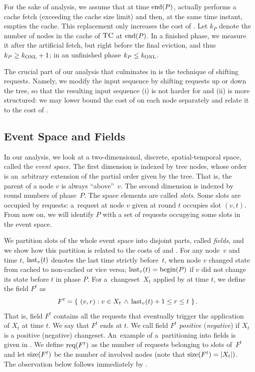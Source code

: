 For the sake of analysis, we assume that at time $\textrm{end}(P)$, \ALGTC actually
performs a cache fetch (exceeding the cache size limit) and then, at the same
time instant, empties the cache. This replacement only increases the cost of
\ALGTC. Let $k_P$ denote the number of nodes in the cache of $\textsc{TC}$ at $\textrm{end}(P)$.
In a finished phase, we measure it after the artificial fetch, but right
before the final eviction, and thus $k_P \geq k_\textnormal{ONL} + 1$; in an unfinished
phase $k_P \leq k_\textnormal{ONL}$.

The crucial part of our analysis that culminates in
 is the technique of shifting requests. Namely, we
modify the input sequence by shifting requests up or down the tree, so that
the resulting input sequence (i) is not harder for \OPT and (ii) is more
structured: we may lower bound the cost of \OPT on each node separately and
relate it to the cost of \ALGTC.



\subsection{Event Space and Fields}
\label{sec:event}

In our analysis, we look at a two-dimensional, discrete, spatial-temporal
space, called the \emph{event space}. The first dimension is indexed by tree
nodes, whose order is an~arbitrary extension of the partial order given by the
tree. That is, the parent of a node $v$ is always ``above''~$v$. The second
dimension is indexed by round numbers of phase~$P$. The space elements are
called \emph{slots}. Some slots are occupied by requests: a~request at node
$v$ given at round $t$ occupies slot $(v,t)$. From now on, we will identify
$P$ with a set of requests occupying some slots in the event space.

We partition slots of the whole event space into disjoint parts, called
\emph{fields}, and we show how this partition is related to the costs of \ALGTC
and \OPT. For any node~$v$ and time $t$, $\textrm{last}_v(t)$ denotes the last time
strictly before~$t$, when node $v$ changed state from cached to non-cached or
vice versa; $\textrm{last}_v(t) = \textrm{begin}(P)$ if $v$ did not change its state before $t$ in
phase $P$. For a~changeset~$X_t$ applied by
\ALGTC at time $t$, we define the field $F^t$ as
\[
  F^t = \left\{\ (v,r) : v \in X_t \, \wedge\, \textrm{last}_v(t)+1 \leq r \leq t\ \right\}.
\]
That is, field $F^t$ contains all the requests that eventually trigger the
application of $X_t$ at time $t$. We say that $F^t$ ends at $t$. We call field
$F^t$ \emph{positive} (\emph{negative}) if $X_t$ is a positive (negative)
changeset. An~example of a~partitioning into fields is given in
. We define $\textrm{req}(F^t)$ as the number of requests
belonging to slots of~$F^t$ and let $\textrm{size}(F^t)$ be the number of involved
nodes (note that $\textrm{size}(F^t) = |X_t|)$. The observation below follows
immediately by .

